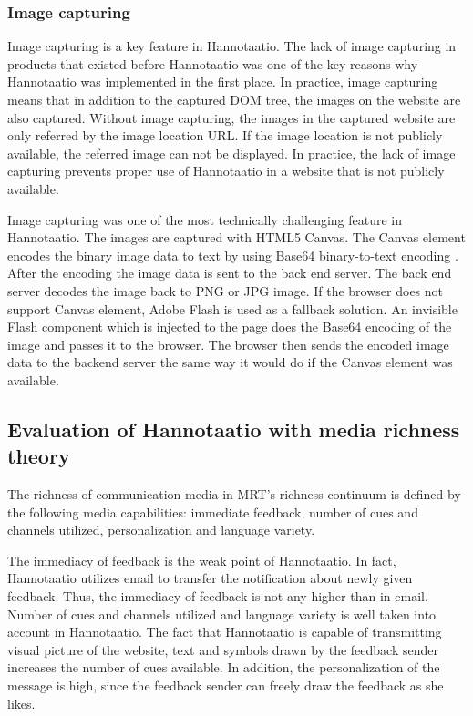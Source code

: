 \documentclass[english,12pt,a4paper,pdftex]{article}
\begin{document}
\subsubsection{Image capturing}
\label{sec:image_capturing}

Image capturing is a key feature in Hannotaatio. The lack of image capturing in products that existed before Hannotaatio was one of the key reasons why Hannotaatio was implemented in the first place. In practice, image capturing means that in addition to the captured \ac{DOM} tree, the images on the website are also captured. Without image capturing, the images in the captured website are only referred by the image location \ac{URL}. If the image location is not publicly available, the referred image can not be displayed. In practice, the lack of image capturing prevents proper use of Hannotaatio in a website that is not publicly available.

Image capturing was one of the most technically challenging feature in Hannotaatio. The images are captured with HTML5 Canvas. The Canvas element encodes the binary image data to text by using Base64 binary-to-text encoding \citep{rfc4648}. After the encoding the image data is sent to the back end server. The back end server decodes the image back to PNG or JPG image. If the browser does not support Canvas element, Adobe Flash is used as a fallback solution. An invisible Flash component which is injected to the page does the Base64 encoding of the image and passes it to the browser. The browser then sends the encoded image data to the backend server the same way it would do if the Canvas element was available.

\subsection{Evaluation of Hannotaatio with media richness theory}

The richness of communication media in \ac{MRT}'s richness continuum is defined by the following media capabilities: immediate feedback, number of cues and channels utilized, personalization and language variety.

The immediacy of feedback is the weak point of Hannotaatio. In fact, Hannotaatio utilizes email to transfer the notification about newly given feedback. Thus, the immediacy of feedback is not any higher than in email. Number of cues and channels utilized and language variety is well taken into account in Hannotaatio. The fact that Hannotaatio is capable of transmitting visual picture of the website, text and symbols drawn by the feedback sender increases the number of cues available. In addition, the personalization of the message is high, since the feedback sender can freely draw the feedback as she likes.
\end{document}
